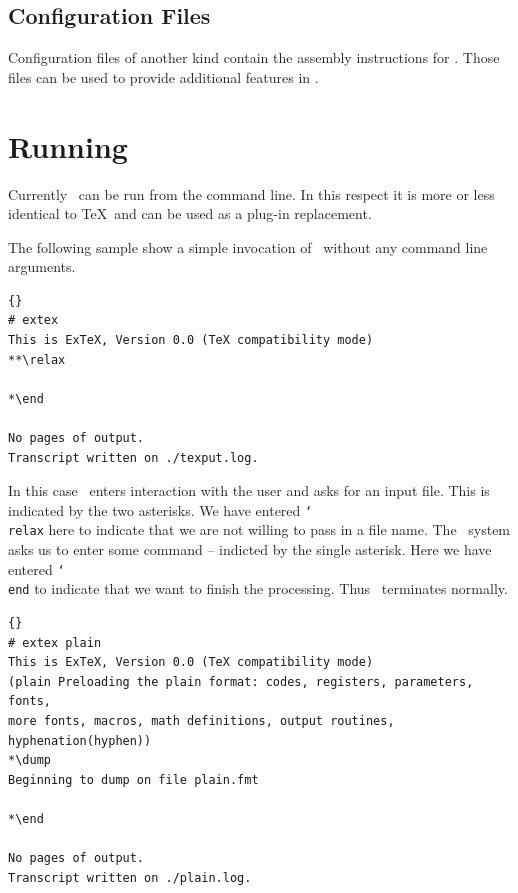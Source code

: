 \documentclass{extex-doc}
\makeatletter
\newcommand\macro[1]{\texttt{\char`\\ #1}\index{#1@\texttt{\char`\\ #1}}}
\makeatother
\begin{document}
\subsection{Configuration Files}

Configuration files of another kind contain the assembly instructions
for \ExTeX. Those files can be used to provide additional features in
\ExTeX. 

\INCOMPLETE


\section{Running \ExTeX}

Currently \ExTeX\ can be run from the command line. In this respect it
is more or less identical to \TeX\ and can be used as a plug-in
replacement.

The following sample show a simple invocation of \ExTeX\ without any
command line arguments.

{%
\begin{lstlisting}{}
# extex
This is ExTeX, Version 0.0 (TeX compatibility mode)
**\relax

*\end

No pages of output.
Transcript written on ./texput.log.
\end{lstlisting}}

In this case \ExTeX\ enters interaction with the user and asks for an
input file. This is indicated by the two asterisks. We have entered
\macro{relax} here to indicate that we are not willing to pass in a
file name. The \ExTeX\ system asks us to enter some command --
indicted by the single asterisk. Here we have entered \macro{end} to
indicate that we want to finish the processing. Thus \ExTeX\ 
terminates normally.

\INCOMPLETE

{%
\begin{lstlisting}{}
# extex plain
This is ExTeX, Version 0.0 (TeX compatibility mode)
(plain Preloading the plain format: codes, registers, parameters, fonts,
more fonts, macros, math definitions, output routines, hyphenation(hyphen))
*\dump
Beginning to dump on file plain.fmt

*\end

No pages of output.
Transcript written on ./plain.log.
\end{lstlisting}}
\end{document}
